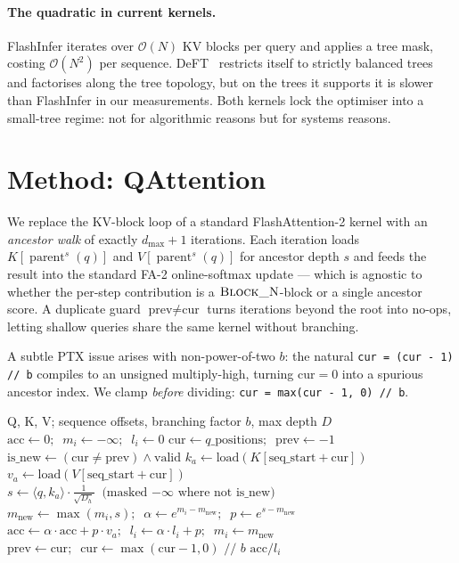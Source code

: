 \documentclass{article}
\newcommand{\method}{QAttention}
\newcommand{\bigO}[1]{\mathcal{O}(#1)}
\newcommand{\numtokens}{N}
\newcommand{\depth}{d}
\newcommand{\branching}{b}
\DeclareMathOperator{\parent}{parent}
\begin{document}
\paragraph{The quadratic in current kernels.}
FlashInfer iterates over $\bigO{\numtokens}$ KV blocks per query and
applies a tree mask, costing $\bigO{\numtokens^2}$ per sequence.
DeFT~\cite{yao2024deft} restricts itself to strictly balanced trees and
factorises along the tree topology, but on the trees it supports it is
slower than FlashInfer in our measurements. Both kernels lock the
optimiser into a small-tree regime: not for algorithmic reasons but for
systems reasons.

\section{Method: \method{}}
\label{sec:method}

We replace the KV-block loop of a standard FlashAttention-2 kernel with
an \emph{ancestor walk} of exactly $\depth_{\max}{+}1$ iterations. Each
iteration loads $K[\parent^s(q)]$ and $V[\parent^s(q)]$ for ancestor
depth $s$ and feeds the result into the standard FA-2 online-softmax
update --- which is agnostic to whether the per-step contribution is a
$\textsc{Block\_N}$-block or a single ancestor score.
A duplicate guard $\text{prev}\!\neq\!\text{cur}$ turns iterations
beyond the root into no-ops, letting shallow queries share the same
kernel without branching.

A subtle PTX issue arises with non-power-of-two $\branching$: the
natural \verb|cur = (cur - 1) // b| compiles to an unsigned multiply-high,
turning $\text{cur}{=}0$ into a spurious ancestor index. We clamp
\emph{before} dividing: \verb|cur = max(cur - 1, 0) // b|.

\begin{algorithm}[t]
\caption{Ancestor-sparse FlashAttention-2 inner loop (single Q-tile, single head).}
\label{alg:kernel}
\begin{algorithmic}[1]
\Require Q, K, V; sequence offsets, branching factor $\branching$, max depth $D$
\State $\text{acc} \gets 0;\;\; m_i \gets -\infty;\;\; l_i \gets 0$
\State $\text{cur} \gets q\_\text{positions};\;\; \text{prev} \gets -1$
                            
  \State $\text{is\_new} \gets (\text{cur} \neq \text{prev}) \wedge \text{valid}$
  \State $k_a \gets \mathrm{load}(K[\text{seq\_start} + \text{cur}])$
  \State $v_a \gets \mathrm{load}(V[\text{seq\_start} + \text{cur}])$
  \State $s \gets \langle q, k_a\rangle \cdot \tfrac{1}{\sqrt{D_h}}\;\;\text{(masked $-\infty$ where not is\_new)}$
  \State $m_{\text{new}} \gets \max(m_i, s);\;\; \alpha \gets e^{m_i - m_{\text{new}}};\;\; p \gets e^{s - m_{\text{new}}}$
  \State $\text{acc} \gets \alpha \cdot \text{acc} + p \cdot v_a;\;\; l_i \gets \alpha\cdot l_i + p;\;\; m_i \gets m_{\text{new}}$
  \State $\text{prev} \gets \text{cur};\;\; \text{cur} \gets \max(\text{cur}-1,0)\,\,/\!/\,\,\branching$
\EndFor
\State \Return $\text{acc} / l_i$
\end{algorithmic}
\end{algorithm}
\end{document}
